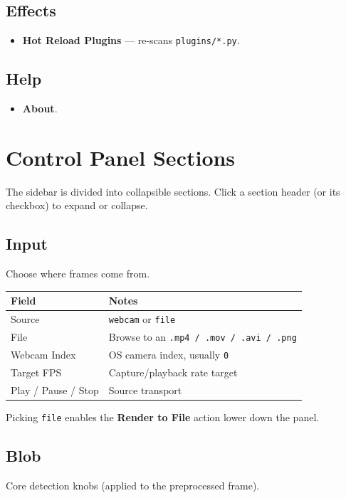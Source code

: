 \documentclass[11pt,a4paper,openany]{report}
\begin{document}
\subsection{Effects}
\begin{itemize}
    \item \textbf{Hot Reload Plugins} --- re-scans \texttt{plugins/*.py}.
\end{itemize}

\subsection{Help}
\begin{itemize}
    \item \textbf{About}.
\end{itemize}

\section{Control Panel Sections}

The sidebar is divided into collapsible sections. Click a section header (or
its checkbox) to expand or collapse.

\subsection{Input}
Choose where frames come from.

\begin{tabularx}{\linewidth}{@{}lX@{}}
    \toprule
    \textbf{Field} & \textbf{Notes} \\
    \midrule
    Source        & \texttt{webcam} or \texttt{file} \\
    File          & Browse to an \texttt{.mp4 / .mov / .avi / .png} \\
    Webcam Index  & OS camera index, usually \texttt{0} \\
    Target FPS    & Capture/playback rate target \\
    Play / Pause / Stop & Source transport \\
    \bottomrule
\end{tabularx}

\begin{btnote}
Picking \texttt{file} enables the \textbf{Render to File} action lower
down the panel.
\end{btnote}

\subsection{Blob}
Core detection knobs (applied to the preprocessed frame).
\end{document}
